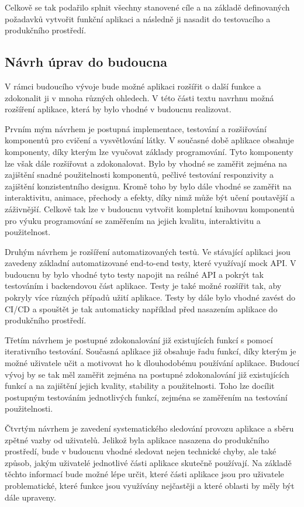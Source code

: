 Celkově se tak podařilo splnit všechny stanovené cíle a na základě definovaných požadavků vytvořit funkční aplikaci a následně ji nasadit do testovacího a produkčního prostředí.

\subsection{Návrh úprav do budoucna}

V rámci budoucího vývoje bude možné aplikaci rozšířit o další funkce a zdokonalit ji v mnoha různých ohledech. V této části textu navrhnu možná rozšíření aplikace, která by bylo vhodné v budoucnu realizovat.

Prvním mým návrhem je postupná implementace, testování a rozšiřování komponentů pro cvičení a vysvětlování látky. V současné době aplikace obsahuje komponenty, díky kterým lze vyučovat základy programování. Tyto komponenty lze však dále rozšiřovat a zdokonalovat. Bylo by vhodné se zaměřit zejména na zajištění snadné použitelnosti komponentů, pečlivé testování responzivity a zajištění konzistentního designu. Kromě toho by bylo dále vhodné se zaměřit na interaktivitu, animace, přechody a efekty, díky nimž může být učení poutavější a záživnější. Celkově tak lze v budoucnu vytvořit kompletní knihovnu komponentů pro výuku programování se zaměřením na jejich kvalitu, interaktivitu a použitelnost.

Druhým návrhem je rozšíření automatizovaných testů. Ve stávající aplikaci jsou zavedeny základní automatizované end-to-end testy, které využívají mock API. V budoucnu by bylo vhodné tyto testy napojit na reálné API a pokrýt tak testováním i backendovou část aplikace. Testy je také možné rozšířit tak, aby pokryly více různých případů užití aplikace. Testy by dále bylo vhodné zavést do CI/CD a spouštět je tak automaticky například před nasazením aplikace do produkčního prostředí.

Třetím návrhem je postupné zdokonalování již existujících funkcí s pomocí iterativního testování. Současná aplikace již obsahuje řadu funkcí, díky kterým je možné uživatele učit a motivovat ho k dlouhodobému používání aplikace. Budoucí vývoj by se tak měl zaměřit zejména na postupné zdokonalování již existujících funkcí a na zajištění jejich kvality, stability a použitelnosti. Toho lze docílit postupným testováním jednotlivých funkcí, zejména se zaměřením na testování použitelnosti.

Čtvrtým návrhem je zavedení systematického sledování provozu aplikace a sběru zpětné vazby od uživatelů. Jelikož byla aplikace nasazena do produkčního prostředí, bude v budoucnu vhodné sledovat nejen technické chyby, ale také způsob, jakým uživatelé jednotlivé části aplikace skutečně používají. Na základě těchto informací bude možné lépe určit, které části aplikace jsou pro uživatele problematické, které funkce jsou využívány nejčastěji a které oblasti by měly být dále upraveny.

